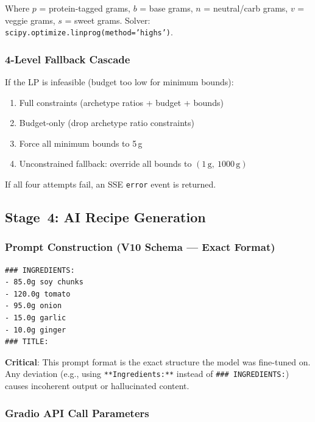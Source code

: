 \documentclass[12pt, a4paper]{article}
\begin{document}
\noindent Where $p$ = protein-tagged grams, $b$ = base grams, $n$ = neutral/carb grams,
$v$ = veggie grams, $s$ = sweet grams.  Solver: \texttt{scipy.optimize.linprog(method='highs')}.

\subsubsection{4-Level Fallback Cascade}

If the LP is infeasible (budget too low for minimum bounds):
\begin{enumerate}
  \item Full constraints (archetype ratios + budget + bounds)
  \item Budget-only (drop archetype ratio constraints)
  \item Force all minimum bounds to 5\,g
  \item Unconstrained fallback: override all bounds to $(1\,\text{g},\ 1000\,\text{g})$
\end{enumerate}
\noindent If all four attempts fail, an SSE \texttt{error} event is returned.

\subsection{Stage~4: AI Recipe Generation}

\subsubsection{Prompt Construction (V10 Schema --- Exact Format)}

\begin{lstlisting}[style=text, caption={Example prompt sent to the fine-tuned Llama~3 model.}]
### INGREDIENTS:
- 85.0g soy chunks
- 120.0g tomato
- 95.0g onion
- 15.0g garlic
- 10.0g ginger
### TITLE:

\end{lstlisting}

\begin{notebox}
\textbf{Critical}: This prompt format is the exact structure the model was fine-tuned on.
Any deviation (e.g., using \texttt{**Ingredients:**} instead of
\texttt{\#\#\# INGREDIENTS:}) causes incoherent output or hallucinated content.
\end{notebox}

\subsubsection{Gradio API Call Parameters}
\end{document}
